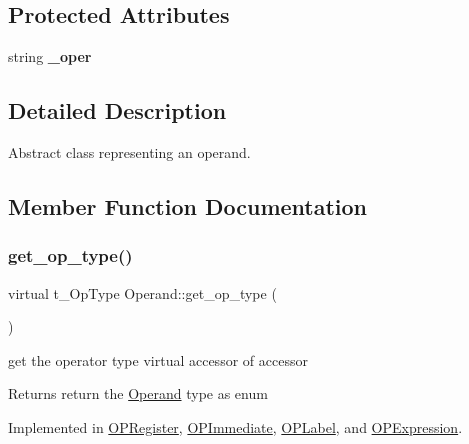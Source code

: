 \subsection*{Protected Attributes}
\begin{DoxyCompactItemize}
\item 
\mbox{\label{class_operand_af70a183445064a0106d41dfeea681790}} 
string {\bfseries \+\_\+oper}
\end{DoxyCompactItemize}


\subsection{Detailed Description}
Abstract class representing an operand. 

\subsection{Member Function Documentation}
\mbox{\label{class_operand_afd469e305a467e2574f34ac9bd6c62b0}} 
\subsubsection{\texorpdfstring{get\+\_\+op\+\_\+type()}{get\_op\_type()}}
{\footnotesize\ttfamily virtual t\+\_\+\+Op\+Type Operand\+::get\+\_\+op\+\_\+type (\begin{DoxyParamCaption}{ }\end{DoxyParamCaption})\hspace{0.3cm}{\ttfamily [pure virtual]}}



get the operator type virtual accessor of accessor 

\begin{DoxyReturn}{Returns}
return the \mbox{\hyperlink{class_operand}{Operand}} type as enum 
\end{DoxyReturn}


Implemented in \mbox{\hyperlink{class_o_p_register_a1be03d6e6422510a1fd12d1f13dfd601}{O\+P\+Register}}, \mbox{\hyperlink{class_o_p_immediate_aed01353798ae57936a9f77dd05eafa88}{O\+P\+Immediate}}, \mbox{\hyperlink{class_o_p_label_a1a6ec701c549a6475d44ffcced1c23b5}{O\+P\+Label}}, and \mbox{\hyperlink{class_o_p_expression_a06f8902130516437d5d93c43a5efcbd2}{O\+P\+Expression}}.

